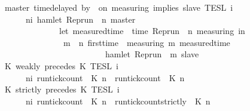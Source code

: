 \begin{isabellebody}
{\isacharbar}\ {\isacartoucheopen}{\isasymlbrakk}\ master\ time{\isacharminus}delayed\ by\ {\isasymdelta}{\isasymtau}\ on\ measuring\ implies\ slave\ {\isasymrbrakk}\isactrlsub T\isactrlsub E\isactrlsub S\isactrlsub L\isactrlbsup {\isasymge}\ i\isactrlesup \ {\isacharequal}\isanewline
\ \ \ \ \ \ {\isacharbraceleft}{\isasymrho}{\isachardot}\ {\isasymforall}n{\isasymge}i{\isachardot}\ hamlet\ {\isacharparenleft}{\isacharparenleft}Rep{\isacharunderscore}run\ {\isasymrho}{\isacharparenright}\ n\ master{\isacharparenright}\ {\isasymlongrightarrow}\isanewline
\ \ \ \ \ \ \ \ \ \ \ \ \ \ \ {\isacharparenleft}let\ measured{\isacharunderscore}time\ {\isacharequal}\ time\ {\isacharparenleft}{\isacharparenleft}Rep{\isacharunderscore}run\ {\isasymrho}{\isacharparenright}\ n\ measuring{\isacharparenright}\ in\isanewline
\ \ \ \ \ \ \ \ \ \ \ \ \ \ \ \ {\isasymforall}m\ {\isasymge}\ n{\isachardot}\ first{\isacharunderscore}time\ {\isasymrho}\ measuring\ m\ {\isacharparenleft}measured{\isacharunderscore}time\ {\isacharplus}\ {\isasymdelta}{\isasymtau}{\isacharparenright}\isanewline
\ \ \ \ \ \ \ \ \ \ \ \ \ \ \ \ \ \ \ \ \ \ \ \ \ {\isasymlongrightarrow}\ hamlet\ {\isacharparenleft}{\isacharparenleft}Rep{\isacharunderscore}run\ {\isasymrho}{\isacharparenright}\ m\ slave{\isacharparenright}\isanewline
\ \ \ \ \ \ \ \ \ \ \ \ \ \ \ {\isacharparenright}\isanewline
\ \ \ \ \ \ {\isacharbraceright}{\isacartoucheclose}\isanewline
{\isacharbar}\ {\isacartoucheopen}{\isasymlbrakk}\ K\ weakly\ precedes\ K\ {\isasymrbrakk}\isactrlsub T\isactrlsub E\isactrlsub S\isactrlsub L\isactrlbsup {\isasymge}\ i\isactrlesup \ {\isacharequal}\isanewline
\ \ \ \ \ \ {\isacharbraceleft}{\isasymrho}{\isachardot}\ {\isasymforall}n{\isasymge}i{\isachardot}\ {\isacharparenleft}run{\isacharunderscore}tick{\isacharunderscore}count\ {\isasymrho}\ K\ n{\isacharparenright}\ {\isasymle}\ {\isacharparenleft}run{\isacharunderscore}tick{\isacharunderscore}count\ {\isasymrho}\ K\ n{\isacharparenright}{\isacharbraceright}{\isacartoucheclose}\isanewline
{\isacharbar}\ {\isacartoucheopen}{\isasymlbrakk}\ K\ strictly\ precedes\ K\ {\isasymrbrakk}\isactrlsub T\isactrlsub E\isactrlsub S\isactrlsub L\isactrlbsup {\isasymge}\ i\isactrlesup \ {\isacharequal}\isanewline
\ \ \ \ \ \ {\isacharbraceleft}{\isasymrho}{\isachardot}\ {\isasymforall}n{\isasymge}i{\isachardot}\ {\isacharparenleft}run{\isacharunderscore}tick{\isacharunderscore}count\ {\isasymrho}\ K\ n{\isacharparenright}\ {\isasymle}\ {\isacharparenleft}run{\isacharunderscore}tick{\isacharunderscore}count{\isacharunderscore}strictly\ {\isasymrho}\ K\ n{\isacharparenright}{\isacharbraceright}{\isacartoucheclose}\isanewline

\end{isabellebody}
